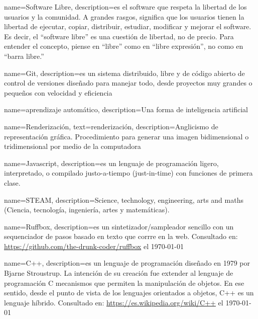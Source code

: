 

{
    name=Software Libre,
    description={es el software que respeta la libertad de los usuarios y la comunidad. A grandes rasgos, significa que los usuarios tienen la libertad de ejecutar, copiar, distribuir, estudiar, modificar y mejorar el software. Es decir, el ``software libre'' es una cuestión de libertad, no de precio. Para entender el concepto, piense en ``libre'' como en ``libre expresión'', no como en ``barra libre.''}}

                 {
                   name=Git,
    description={es un sistema distribuido, libre y de código abierto de control de versiones diseñado para manejar todo, desde proyectos muy grandes o pequeños con velocidad y eficiencia}}

                 {
                   name=aprendizaje automático,
    description={Una forma de inteligencia artificial}}

                 {
                   name=Renderización,
                   text=renderización,
    description={Anglicismo de representación gráfica. Procedimiento para generar una imagen bidimensional o tridimensional por medio de la computadora}}


                 {
                   name=Javascript,
    description={es un lenguaje de programación ligero, interpretado, o compilado justo-a-tiempo (just-in-time) con funciones de primera clase.}}


                 {
                   name=STEAM,
    description={Science, technology, engineering, arts and maths (Ciencia, tecnología, ingeniería, artes y matemáticas). }}

                 {
                   name=Ruffbox,
    description={es un sintetizador/sampleador sencillo con un sequenciador de pasos basado en texto que corrre en la web. Consultado en: \url{https://github.com/the-drunk-coder/ruffbox} el \today}}


                 {
                   name=C++,
    description={es un lenguaje de programación diseñado en 1979 por Bjarne Stroustrup. La intención de su creación fue extender al lenguaje de programación C mecanismos que permiten la manipulación de objetos. En ese sentido, desde el punto de vista de los lenguajes orientados a objetos, C++ es un lenguaje híbrido. Consultado en: \url{https://es.wikipedia.org/wiki/C++} el \today}}


